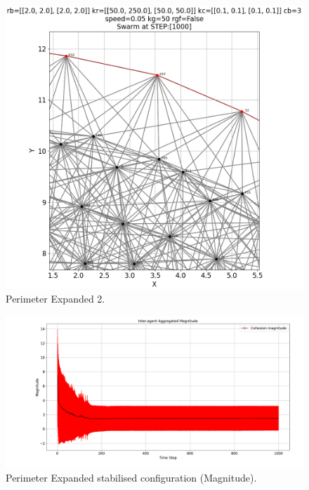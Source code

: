 \documentclass[12pt,a4paper]{IEEEtran}
\begin{document}
\begin{figure}[H]
	\begin{center}
		\includegraphics[width=1.0\linewidth]{figures/perimExpand2}
	\end{center}
	\caption{Perimeter Expanded 2. \label{fig:perimExpand2}}
\end{figure}

\begin{figure}[H]
	\begin{center}
		\includegraphics[width=1.0\linewidth]{figures/perimExpandMagnitude}
	\end{center}
	\caption{Perimeter Expanded stabilised configuration (Magnitude). \label{fig:perimExpandMagnitude}}
\end{figure}
\end{document}
